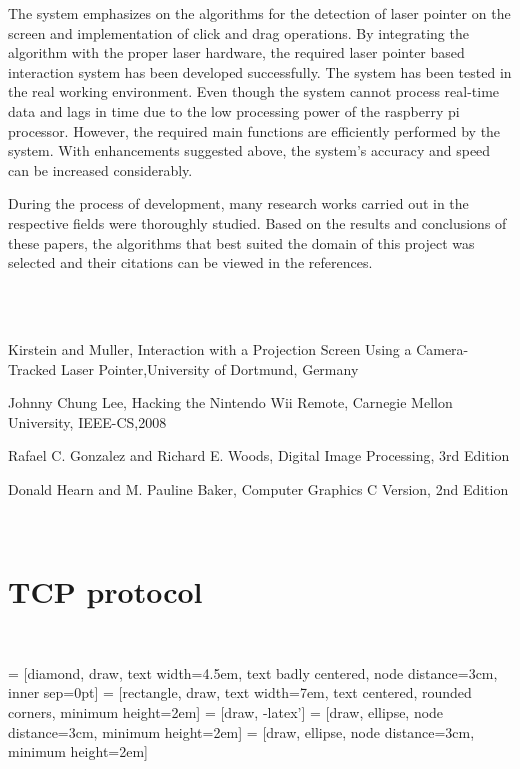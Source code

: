 \documentclass[12pt, a4paper]{article}
\begin{document}
{   The system emphasizes on the algorithms for the detection of laser pointer on the screen and implementation of click  and drag operations. By integrating the algorithm with the proper laser hardware, the required laser pointer based interaction system has been developed successfully. The system has been tested in the real working environment. Even though the system cannot process real-time data and lags in time due to the low processing power of the raspberry pi processor. However, the required main functions are efficiently performed by the system. With enhancements suggested above, the system's accuracy and speed can be increased considerably. 
   
   During the process of development, many research works carried out in the respective fields were thoroughly studied. Based on the results and conclusions of these papers, the algorithms that best suited the domain of this project was selected and their citations can be viewed in the references.
   
   
\newpage
\renewcommand{\refname}{REFERENCES}
~\\
~\\
\begin{thebibliography}{}
	 Kirstein and Muller, Interaction with a Projection Screen Using a Camera-Tracked Laser Pointer,University of Dortmund, Germany 
	

	 Johnny Chung Lee, Hacking the Nintendo Wii Remote, Carnegie 		   Mellon University, IEEE-CS,2008 

	
	 Rafael C. Gonzalez and Richard E. Woods, Digital Image Processing, 3rd Edition
	
	 Donald Hearn and M. Pauline Baker, Computer Graphics C Version, 2nd Edition 
\end{thebibliography}

\newpage
\begin{appendices}
~\\
\section{TCP protocol}
~\\
\begin{appendixfig}
\centering
{} = [diamond, draw, text width=4.5em, text badly centered, node distance=3cm, inner sep=0pt]
 = [rectangle, draw, text width=7em, text centered, rounded corners, minimum height=2em]
 = [draw, -latex']
 = [draw, ellipse, node distance=3cm,
    minimum height=2em]
 = [draw, ellipse, node distance=3cm,
    minimum height=2em]    
\end{appendixfig}
\end{appendices}}
\end{document}
